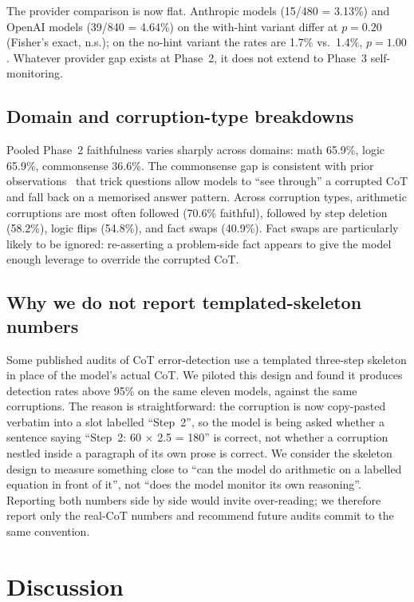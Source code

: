 \documentclass[11pt]{article}
\begin{document}
The provider comparison is now flat. Anthropic models (15/480 = 3.13\%) and OpenAI models (39/840 = 4.64\%) on the with-hint variant differ at $p=0.20$ (Fisher's exact, n.s.); on the no-hint variant the rates are 1.7\% vs.\ 1.4\%, $p=1.00$. Whatever provider gap exists at Phase~2, it does not extend to Phase~3 self-monitoring.

\subsection{Domain and corruption-type breakdowns}

Pooled Phase~2 faithfulness varies sharply across domains: math 65.9\%, logic 65.9\%, commonsense 36.6\%. The commonsense gap is consistent with prior observations~\citep{turpin2023language} that trick questions allow models to ``see through'' a corrupted CoT and fall back on a memorised answer pattern. Across corruption types, arithmetic corruptions are most often followed (70.6\% faithful), followed by step deletion (58.2\%), logic flips (54.8\%), and fact swaps (40.9\%). Fact swaps are particularly likely to be ignored: re-asserting a problem-side fact appears to give the model enough leverage to override the corrupted CoT.

\subsection{Why we do not report templated-skeleton numbers}
\label{sec:why-not-template}

Some published audits of CoT error-detection use a templated three-step skeleton in place of the model's actual CoT. We piloted this design and found it produces detection rates above 95\% on the same eleven models, against the same corruptions. The reason is straightforward: the corruption is now copy-pasted verbatim into a slot labelled ``Step~2'', so the model is being asked whether a sentence saying ``Step~2: 60 $\times$ 2.5 = 180'' is correct, not whether a corruption nestled inside a paragraph of its own prose is correct. We consider the skeleton design to measure something close to ``can the model do arithmetic on a labelled equation in front of it'', not ``does the model monitor its own reasoning''. Reporting both numbers side by side would invite over-reading; we therefore report only the real-CoT numbers and recommend future audits commit to the same convention.

\section{Discussion}
\label{sec:discussion}
\end{document}
